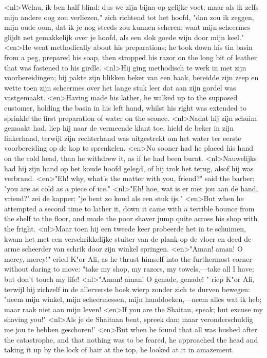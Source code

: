 <nl>Welnu, ik ben half blind: dus we zijn bijna op gelijke voet; maar als ik zelfs mijn andere oog zou verliezen," zich richtend  tot het hoofd, "dan zou ik zeggen, mijn oude oom, dat ik je nog steeds zou kunnen scheren; want mijn scheermes glijdt net gemakkelijk over je hoofd, als een slok  goede wijn door mijn keel."
<en>He went methodically about his preparations; he took down his tin basin from a peg, prepared his soap, then stropped his razor on the long bit of leather that was fastened to his girdle.
<nl>Hij ging methodisch te werk in met zijn voorbereidingen; hij pakte zijn blikken beker van een haak, bereidde zijn zeep en wette toen zijn scheermes over het lange stuk leer dat aan zijn gordel was vastgemaakt.
<en>Having made his lather, he walked up to the supposed customer, holding the basin in his left hand, whilst his right was extended to sprinkle the first preparation of water on the sconce.
<nl>Nadat hij zijn schuim gemaakt had, liep hij naar de vermeende klant toe, hield de beker in zijn linkerhand, terwijl zijn rechterhand was uitgestrekt om het  water ter eerste voorbereiding op de kop te sprenkelen.
<en>No sooner had he placed his hand on the cold head, than he withdrew it, as if he had been burnt.
<nl>Nauwelijks had hij zijn hand op het koude hoofd gelegd, of hij trok het terug, alsof hij was verbrand.
<en>"Eh! why, what's the matter with you, friend?" said the barber; "you are as cold as a piece of ice."
<nl>"Eh! hoe, wat is er met jou aan de hand, vriend?' zei de kapper; "je bent zo koud als een stuk ijs."
<en>But when he attempted a second time to lather it, down it came with a terrible bounce from the shelf to the floor, and made the poor shaver jump quite across his shop with the fright.
<nl>Maar toen hij een tweede keer probeerde het in te schuimen, kwam het met een verschrikkelijke stuiter van de plank op de vloer en deed de arme scheerder van schrik door zijn winkel springen.
<en>"Aman! aman! O mercy, mercy!" cried K"or Ali, as he thrust himself into the furthermost corner without daring to move: "take my shop, my razors, my towels,---take all I have; but don't touch my life!
<nl>"Aman! aman! O genade, genade! " riep K"or Ali, terwijl hij zichzelf  in de allerverste hoek wierp zonder zich te durven bewegen: "neem mijn winkel, mijn scheermessen, mijn handdoeken,---neem alles wat ik heb; maar raak niet aan mijn leven!
<en>If you are the Shaitan, speak; but excuse my shaving you!"
<nl>Als je de Shaitaan bent, spreek dan; maar veronderschuldig me jou te hebben geschoren!'
<en>But when he found that all was hushed after the catastrophe, and that nothing was to be feared, he approached the head and taking it up by the lock of hair at the top, he looked at it in amazement.
